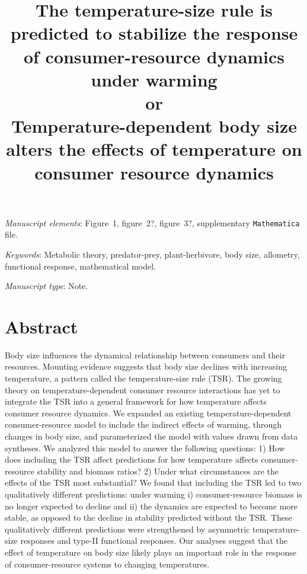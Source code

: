 \documentclass[11pt]{article}
\title{The temperature-size rule is predicted to stabilize the response of consumer-resource dynamics under warming\\
or\\
Temperature-dependent body size alters the effects of temperature on consumer resource dynamics}
\date{}
\begin{document}
\maketitle

%
%

\bigskip

\textit{Manuscript elements}: Figure~1, figure~2?, figure~3?, supplementary \texttt{Mathematica} file.
\bigskip

\textit{Keywords}: Metabolic theory, predator-prey, plant-herbivore, body size, allometry, functional response, mathematical model.

\bigskip

\textit{Manuscript type}: Note. 

\bigskip


\linenumbers{}
\modulolinenumbers[3]

\newpage{}

\section*{Abstract}
Body size influences the dynamical relationship between consumers and their resources. 
Mounting evidence suggests that body size declines with increasing temperature, a pattern called the temperature-size rule (TSR). 
The growing theory on temperature-dependent consumer resource interactions has yet to integrate the TSR into a general framework for how temperature affects consumer resource dynamics. 
We expanded an existing temperature-dependent consumer-resource model to include the indirect effects of warming, through changes in body size, and parameterized the model with values drawn from data syntheses. 
We analyzed this model to answer the following questions: 
1) How does including the TSR affect predictions for how temperature affects consumer-resource stability and biomass ratios? 
2) Under what circumstances are the effects of the TSR most substantial? 
We found that including the TSR led to two qualitatively different predictions: under warming i) consumer-resource biomass is no longer expected to decline and ii) the dynamics are expected to become more stable, as opposed to the decline in stability predicted without the TSR. 
These qualitatively different predictions were strengthened by asymmetric temperature-size responses and type-II functional responses.
Our analyses suggest that the effect of temperature on body size likely plays an important role in the response of consumer-resource systems to changing temperatures. 
\end{document}
